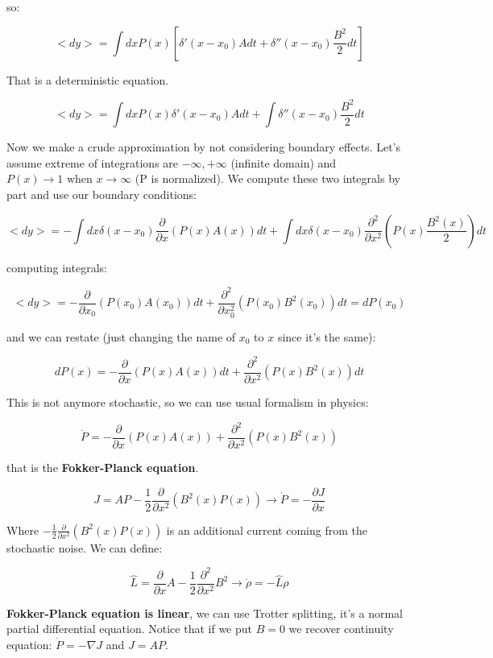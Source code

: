 \documentclass[a4paper, italian, openany]{book}
\begin{document}
so:

$$<dy> = \int dx P(x) \left [ \delta'(x-x_0)Adt+\delta''(x-x_0)\frac{B^2}{2}dt \right ]$$

That is a deterministic equation.

$$<dy> = \int dx P(x)\delta'(x-x_0)Adt + \int \delta''(x-x_0)\frac{B^2}{2}dt$$

Now we make a crude approximation by not considering boundary effects. Let's assume extreme of integrations are $-\infty, +\infty$ (infinite domain) and $P(x) \to 1 \mbox{ when } x \to \infty$ (P is normalized).\newline
We compute these two integrals by part and use our boundary conditions:

$$<dy> = -\int dx \delta(x-x_0) \frac{\partial}{\partial x} (P(x) A(x)) dt + \int dx \delta(x-x_0) \frac{\partial^2}{\partial x^2}\left ( P(x) \frac{B^2(x)}{2} \right ) dt$$

computing integrals:

$$<dy> = -\frac{\partial}{\partial x_0} \left ( P(x_0) A(x_0)\right ) dt + \frac{\partial^2}{\partial x_0^2} \left ( P(x_0) B^2(x_0) \right ) dt = dP(x_0)$$

and we can restate (just changing the name of $x_0$ to $x$ since it's the same):

$$dP(x) = -\frac{\partial}{\partial x} \left ( P(x) A(x)\right ) dt + \frac{\partial^2}{\partial x^2} \left ( P(x) B^2(x) \right ) dt$$

This is not anymore stochastic, so we can use usual formalism in physics:

$$\dot{P} = -\frac{\partial}{\partial x} \left ( P(x) A(x)\right ) + \frac{\partial^2}{\partial x^2} \left ( P(x) B^2(x) \right )$$

that is the \textbf{Fokker-Planck equation}.\newline

$$J = AP -\frac{1}{2} \frac{\partial}{\partial x^2} \left ( B^2(x) P(x) \right ) \rightarrow \dot{P} = - \frac{\partial J}{\partial x}$$

Where $ -\frac{1}{2} \frac{\partial}{\partial x^2} \left ( B^2(x) P(x) \right )$ is an additional current coming from the stochastic noise.\newline
We can define:

$$\hat{L} = \frac{\partial}{\partial x} A - \frac{1}{2} \frac{\partial^2}{\partial x^2} B^2 \rightarrow \dot{\rho} = -\hat{L} \rho$$

\textbf{Fokker-Planck equation is linear}, we can use Trotter splitting, it's a normal partial differential equation.
Notice that if we put $B=0$ we recover continuity equation: $\dot{P} = -\nabla J$ and $J=AP$.
\end{document}
